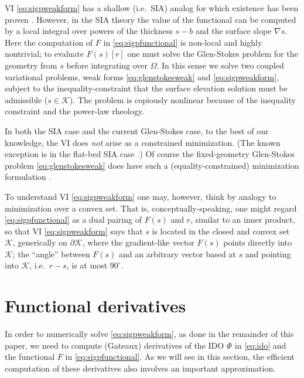 \documentclass[letterpaper,final,12pt,reqno]{amsart}
\theoremstyle{claim}
\newcommand{\grad}{\nabla}
\numberwithin{equation}{section}
\numberwithin{figure}{section}
\numberwithin{table}{section}
\numberwithin{theorem}{section}
\begin{document}
VI \eqref{eq:sigpweakform} has a shallow (i.e.~SIA) analog for which existence has been proven \cite{JouvetBueler2012}.  However, in the SIA theory the value of the functional can be computed by a local integral over powers of the thickness $s-b$ and the surface slope $\grad s$.  Here the computation of $F$ in \eqref{eq:sigpfunctional} is non-local and highly nontrivial; to evaluate $F(s)[r]$ one must solve the Glen-Stokes problem for the geometry from $s$ before integrating over $\Omega$.  In this sense we solve two coupled variational problems, weak forms \eqref{eq:glenstokesweak} and \eqref{eq:sigpweakform}, subject to the inequality-constraint that the surface elevation solution must be admissible ($s \in \mathcal{K}$).  The problem is copiously nonlinear because of the inequality constraint and the power-law rheology.

In both the SIA case and the current Glen-Stokes case, to the best of our knowledge, the VI does \emph{not} arise as a constrained minimization.  (The known exception is in the flat-bed SIA case \cite{JouvetBueler2012}.)  Of course the fixed-geometry Glen-Stokes problem \eqref{eq:glenstokesweak} does have such a (equality-constrained) minimization formulation \cite{Elmanetal2014,JouvetRappaz2011}.

To understand VI \eqref{eq:sigpweakform} one may, however, think by analogy to minimization over a convex set.  That is, conceptually-speaking, one might regard \eqref{eq:sigpfunctional} as a dual pairing of $F(s)$ and $r$, similar to an inner product, so that VI \eqref{eq:sigpweakform} says that $s$ is located in the closed and convex set $\mathcal{K}$, generically on $\partial\mathcal{K}$, where the gradient-like vector $F(s)$ points directly into $\mathcal{K}$; the ``angle'' between $F(s)$ and an arbitrary vector based at $s$ and pointing into $\mathcal{K}$, i.e.~$r-s$, is at most $90^\circ$.


\section{Functional derivatives} \label{sec:deriv}

In order to numerically solve \eqref{eq:sigpweakform}, as done in the remainder of this paper, we need to compute (Gateaux) derivatives of the IDO $\Phi$ in \eqref{eq:ido} and the functional $F$ in \eqref{eq:sigpfunctional}.  As we will see in this section, the efficient computation of these derivatives also involves an important approximation.
\end{document}
